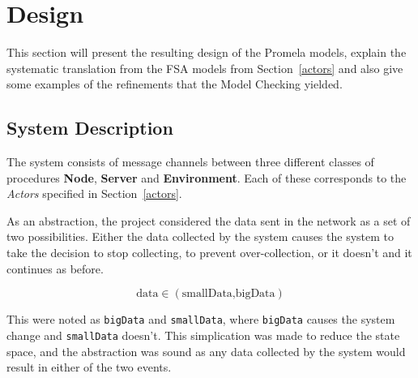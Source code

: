 \chapter{Design}

This section will present the resulting design of the Promela models, explain the systematic translation from the FSA models from Section~\ref{actors} and also give some examples of the refinements that the Model Checking yielded. 



\section{System Description} \label{design} %

The system consists of message channels between three different classes of procedures \textbf{Node}, \textbf{Server} and \textbf{Environment}. Each of these corresponds to the \textit{Actors} specified in Section~\ref{actors}. 


As an abstraction, the project considered the data sent in the network as a set of two possibilities. Either the data collected by the system causes the system to take the decision to stop collecting, to prevent over-collection, or it doesn't and it continues as before. 

\[ \text{data} \in (\text{smallData,bigData}) \]

This were noted as \texttt{bigData} and \texttt{smallData}, where \texttt{bigData} causes the system change and \texttt{smallData} doesn't. This simplication was made to reduce the state space, and the abstraction was sound as any data collected by the system would result in either of the two events. 

